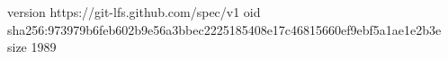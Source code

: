 version https://git-lfs.github.com/spec/v1
oid sha256:973979b6feb602b9e56a3bbec2225185408e17c46815660ef9ebf5a1ae1e2b3e
size 1989
